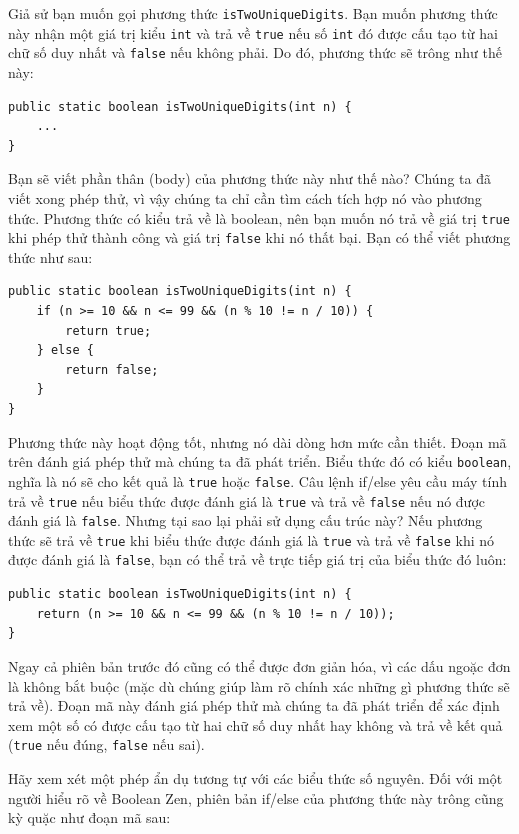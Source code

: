 Giả sử bạn muốn gọi phương thức \texttt{isTwoUniqueDigits}. Bạn muốn phương thức này nhận một giá trị kiểu \texttt{int} và trả về \texttt{true} nếu số \texttt{int} đó được cấu tạo từ hai chữ số duy nhất và \texttt{false} nếu không phải. Do đó, phương thức sẽ trông như thế này:

\begin{verbatim}
public static boolean isTwoUniqueDigits(int n) {
    ...
}
\end{verbatim}

Bạn sẽ viết phần thân (body) của phương thức này như thế nào? Chúng ta đã viết xong phép thử, vì vậy chúng ta chỉ cần tìm cách tích hợp nó vào phương thức. Phương thức có kiểu trả về là boolean, nên bạn muốn nó trả về giá trị \texttt{true} khi phép thử thành công và giá trị \texttt{false} khi nó thất bại. Bạn có thể viết phương thức như sau:

\begin{verbatim}
public static boolean isTwoUniqueDigits(int n) {
    if (n >= 10 && n <= 99 && (n % 10 != n / 10)) {
        return true;
    } else {
        return false;
    }
}
\end{verbatim}

Phương thức này hoạt động tốt, nhưng nó dài dòng hơn mức cần thiết. Đoạn mã trên đánh giá phép thử mà chúng ta đã phát triển. Biểu thức đó có kiểu \texttt{boolean}, nghĩa là nó sẽ cho kết quả là \texttt{true} hoặc \texttt{false}. Câu lệnh if/else yêu cầu máy tính trả về \texttt{true} nếu biểu thức được đánh giá là \texttt{true} và trả về \texttt{false} nếu nó được đánh giá là \texttt{false}. Nhưng tại sao lại phải sử dụng cấu trúc này? Nếu phương thức sẽ trả về \texttt{true} khi biểu thức được đánh giá là \texttt{true} và trả về \texttt{false} khi nó được đánh giá là \texttt{false}, bạn có thể trả về trực tiếp giá trị của biểu thức đó luôn:

\begin{verbatim}
public static boolean isTwoUniqueDigits(int n) {
    return (n >= 10 && n <= 99 && (n % 10 != n / 10));
}
\end{verbatim}

Ngay cả phiên bản trước đó cũng có thể được đơn giản hóa, vì các dấu ngoặc đơn là không bắt buộc (mặc dù chúng giúp làm rõ chính xác những gì phương thức sẽ trả về). Đoạn mã này đánh giá phép thử mà chúng ta đã phát triển để xác định xem một số có được cấu tạo từ hai chữ số duy nhất hay không và trả về kết quả (\texttt{true} nếu đúng, \texttt{false} nếu sai).

Hãy xem xét một phép ẩn dụ tương tự với các biểu thức số nguyên. Đối với một người hiểu rõ về Boolean Zen, phiên bản if/else của phương thức này trông cũng kỳ quặc như đoạn mã sau:

